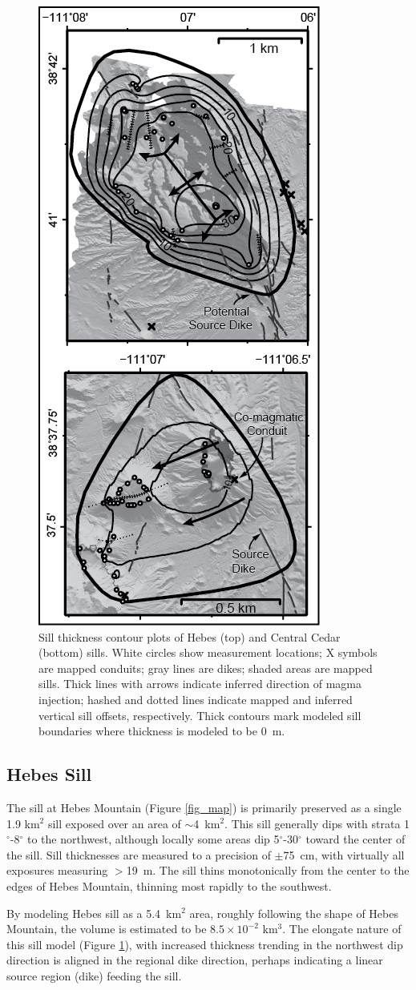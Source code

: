 \documentclass[12pt,letter]{article}
\begin{document}
\begin{figure}
\centering
\includegraphics[width=0.4\linewidth]{figures/Fig3-models}
\caption{Sill thickness contour plots of Hebes (top) and Central Cedar (bottom) sills. White circles show measurement locations; X symbols are mapped conduits; gray lines are dikes; shaded areas are mapped sills. Thick lines with arrows indicate inferred direction of magma injection; hashed and dotted lines indicate mapped and inferred vertical sill offsets, respectively. Thick contours mark modeled sill boundaries where thickness is modeled to be 0~m.}
\label{fig_twomodels}
\end{figure}

\subsection{Hebes Sill}

The sill at Hebes Mountain (Figure \ref{fig_map}) is primarily preserved as a single 1.9 km$^2$ sill exposed over an area of $\sim$4~km$^2$. This sill generally dips with strata 1$^{\circ}$-8$^{\circ}$ to the northwest, although locally some areas dip 5$^{\circ}$-30$^{\circ}$ toward the center of the sill. Sill thicknesses are measured to a precision of $\pm$75~cm, with virtually all exposures measuring $>$19~m. The sill thins monotonically from the center to the edges of Hebes Mountain, thinning most rapidly to the southwest.

By modeling Hebes sill as a 5.4~km$^2$ area, roughly following the shape of Hebes Mountain, the volume is estimated to be $8.5\times 10^{-2}$ km$^3$. The elongate nature of this sill model (Figure \ref{fig_twomodels}), with increased thickness trending in the northwest dip direction is aligned in the regional dike direction, perhaps indicating a linear source region (dike) feeding the sill.
\end{document}
